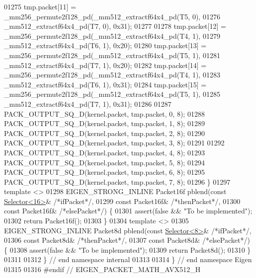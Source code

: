 \begin{DoxyCode}
01275   tmp.packet[11] = \_mm256\_permute2f128\_pd(\_mm512\_extractf64x4\_pd(T5, 0),
01276                                           \_mm512\_extractf64x4\_pd(T7, 0), 0x31);
01277 
01278   tmp.packet[12] = \_mm256\_permute2f128\_pd(\_mm512\_extractf64x4\_pd(T4, 1),
01279                                           \_mm512\_extractf64x4\_pd(T6, 1), 0x20);
01280   tmp.packet[13] = \_mm256\_permute2f128\_pd(\_mm512\_extractf64x4\_pd(T5, 1),
01281                                           \_mm512\_extractf64x4\_pd(T7, 1), 0x20);
01282   tmp.packet[14] = \_mm256\_permute2f128\_pd(\_mm512\_extractf64x4\_pd(T4, 1),
01283                                           \_mm512\_extractf64x4\_pd(T6, 1), 0x31);
01284   tmp.packet[15] = \_mm256\_permute2f128\_pd(\_mm512\_extractf64x4\_pd(T5, 1),
01285                                           \_mm512\_extractf64x4\_pd(T7, 1), 0x31);
01286 
01287   PACK\_OUTPUT\_SQ\_D(kernel.packet, tmp.packet, 0, 8);
01288   PACK\_OUTPUT\_SQ\_D(kernel.packet, tmp.packet, 1, 8);
01289   PACK\_OUTPUT\_SQ\_D(kernel.packet, tmp.packet, 2, 8);
01290   PACK\_OUTPUT\_SQ\_D(kernel.packet, tmp.packet, 3, 8);
01291 
01292   PACK\_OUTPUT\_SQ\_D(kernel.packet, tmp.packet, 4, 8);
01293   PACK\_OUTPUT\_SQ\_D(kernel.packet, tmp.packet, 5, 8);
01294   PACK\_OUTPUT\_SQ\_D(kernel.packet, tmp.packet, 6, 8);
01295   PACK\_OUTPUT\_SQ\_D(kernel.packet, tmp.packet, 7, 8);
01296 \}
01297 \textcolor{keyword}{template} <>
01298 EIGEN\_STRONG\_INLINE Packet16f pblend(\textcolor{keyword}{const} \hyperlink{struct_eigen_1_1internal_1_1_selector}{Selector<16>}& \textcolor{comment}{/*ifPacket*/},
01299                                      \textcolor{keyword}{const} Packet16f& \textcolor{comment}{/*thenPacket*/},
01300                                      \textcolor{keyword}{const} Packet16f& \textcolor{comment}{/*elsePacket*/}) \{
01301   assert(\textcolor{keyword}{false} && \textcolor{stringliteral}{"To be implemented"});
01302   \textcolor{keywordflow}{return} Packet16f();
01303 \}
01304 \textcolor{keyword}{template} <>
01305 EIGEN\_STRONG\_INLINE Packet8d pblend(\textcolor{keyword}{const} \hyperlink{struct_eigen_1_1internal_1_1_selector}{Selector<8>}& \textcolor{comment}{/*ifPacket*/},
01306                                     \textcolor{keyword}{const} Packet8d& \textcolor{comment}{/*thenPacket*/},
01307                                     \textcolor{keyword}{const} Packet8d& \textcolor{comment}{/*elsePacket*/}) \{
01308   assert(\textcolor{keyword}{false} && \textcolor{stringliteral}{"To be implemented"});
01309   \textcolor{keywordflow}{return} Packet8d();
01310 \}
01311 
01312 \} \textcolor{comment}{// end namespace internal}
01313 
01314 \} \textcolor{comment}{// end namespace Eigen}
01315 
01316 \textcolor{preprocessor}{#endif // EIGEN\_PACKET\_MATH\_AVX512\_H}
\end{DoxyCode}
